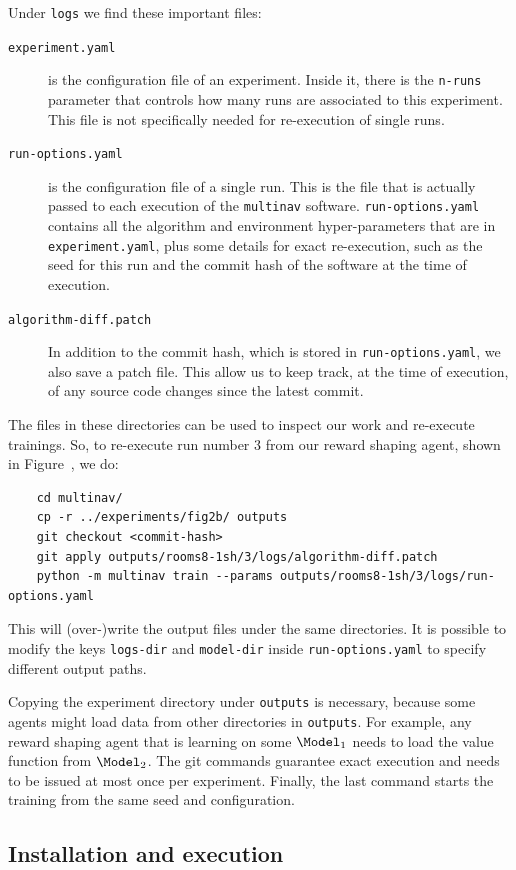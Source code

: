 Under \texttt{logs} we find these important files:
\begin{description}
	\item[\texttt{experiment.yaml}] is the configuration file of an experiment.
		Inside it, there is the \verb!n-runs! parameter that controls how many runs are associated to this experiment.
		This file is not specifically needed for re-execution of single runs.
	\item[\texttt{run-options.yaml}] is the configuration file of a single run.
		This is the file that is actually passed to each execution of the \texttt{multinav} software.
		\texttt{run-options.yaml} contains all the algorithm and environment hyper-parameters that are in \texttt{experiment.yaml},
		plus some details for exact re-execution, such as the seed for this run and the commit hash of the software at the time of execution.
	\item[\texttt{algorithm-diff.patch}] In addition to the commit hash, which is stored in \texttt{run-options.yaml},
		we also save a patch file. This allow us to keep track, at the time of execution, of any source code changes since the latest commit.
\end{description}

The files in these directories can be used to inspect our work and re-execute trainings.
So, to re-execute run number 3 from our reward shaping agent, shown in Figure~, we do:
\begin{verbatim}
	cd multinav/
	cp -r ../experiments/fig2b/ outputs
	git checkout <commit-hash>
	git apply outputs/rooms8-1sh/3/logs/algorithm-diff.patch
	python -m multinav train --params outputs/rooms8-1sh/3/logs/run-options.yaml
\end{verbatim}
This will (over-)write the output files under the same directories.
It is possible to modify the keys \texttt{logs-dir} and \texttt{model-dir}
inside \texttt{run-options.yaml} to specify different output paths.

Copying the experiment directory under \texttt{outputs} is necessary,
because some agents might load data from other directories in \texttt{outputs}.
For example, any reward shaping agent that is learning on some $\Model_1$ needs to load the value function from $\Model_2$.
The git commands guarantee exact execution and needs to be issued at most once per experiment.
Finally, the last command starts the training from the same seed and configuration.


\subsection{Installation and execution}


